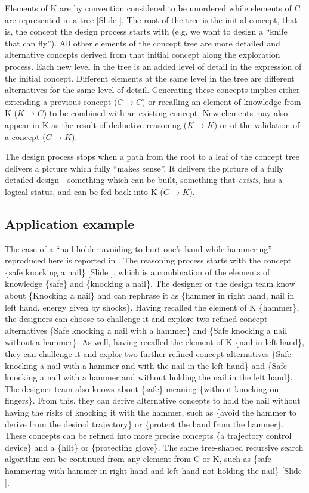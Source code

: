 \documentclass{article}
\newcounter{slide}
\begin{document}
Elements of K are by convention considered to be unordered while elements of C are represented in a tree {\color{blue}[Slide ]}. The root of the tree is the initial concept, that is, the concept the design process starts with (e.g. we want to design a ``knife that can fly''). All other elements of the concept tree are more detailed and alternative concepts derived from that initial concept along the exploration process. Each new level in the tree is an added level of detail in the expression of the initial concept. Different elements at the same level in the tree are different alternatives for the same level of detail. Generating these concepts implies either extending a previous concept ($C\rightarrow C$) or recalling an element of knowledge from K ($K\rightarrow C$) to be combined with an existing concept. New elements may also appear in K as the result of deductive reasoning ($K\rightarrow K$) or of the validation of a concept ($C\rightarrow K$). 

The design process stops when a path from the root to a leaf of the concept tree delivers a picture which fully ``makes sense''. It delivers the picture of a fully detailed design---something which can be built, something that \emph{exists}, has a logical status, and can be fed back into K ($C\rightarrow K$).

\subsection{Application example}
\label{sec:CKExample}
The case of a ``nail holder avoiding to hurt one's hand while hammering'' reproduced here is reported in \cite{hatchuel2004ck}.
The reasoning process starts with the concept \{safe knocking a nail\} {\color{blue}[Slide ]}, which is a combination of the elements of knowledge \{safe\} and \{knocking a nail\}. The designer or the design team know about \{Knocking a nail\} and can rephrase it as \{hammer in right hand, nail in left hand, energy given by shocks\}. Having recalled the element of K \{hammer\}, the designers can choose to challenge it and explore two refined concept alternatives \{Safe knocking a nail with a hammer\} and \{Safe knocking a nail without a hammer\}. As well, having recalled the element of K \{nail in left hand\}, they can challenge it and explor two further refined concept alternatives \{Safe knocking a nail with a hammer and with the nail in the left hand\} and \{Safe knocking a nail with a hammer and without holding the nail in the left hand\}. The designer team also knows about \{safe\} meaning \{without knocking on fingers\}. From this, they can derive alternative concepts to hold the nail without having the risks of knocking it with the hammer, such as \{avoid the hammer to derive from the desired trajectory\} or \{protect the hand from the hammer\}. These concepts can be refined into more precise concepts \{a trajectory control device\} and a \{hilt\} or \{protecting glove\}. The same tree-shaped recursive search algorithm can be continued from any element from C or K, such as \{safe hammering with hammer in right hand and left hand not holding the nail\} {\color{blue}[Slide ]}. 
\end{document}
